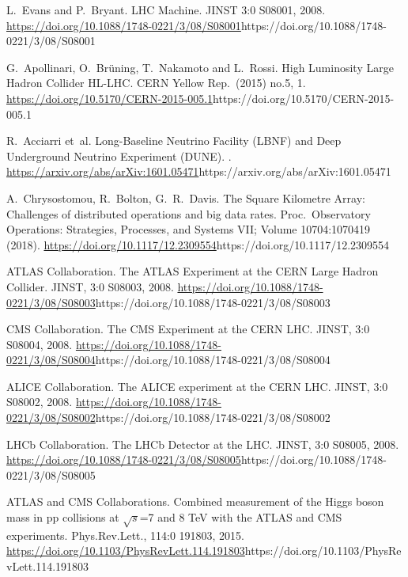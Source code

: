 \documentclass[11pt]{article}
\begin{document}
\begin{thebibliography}{99}
\itemsep=1pt
\begin{small}

L.~Evans and P.~Bryant.
\newblock LHC Machine.
\newblock JINST 3:0 S08001, 2008.
\newblock \url{https://doi.org/10.1088/1748-0221/3/08/S08001}{https://doi.org/10.1088/1748-0221/3/08/S08001}

G.~Apollinari, O.~Brüning, T.~Nakamoto and L.~Rossi.
\newblock High Luminosity Large Hadron Collider HL-LHC.
\newblock CERN Yellow Rep.\  (2015) no.5,  1.
\newblock \url{https://doi.org/10.5170/CERN-2015-005.1}{https://doi.org/10.5170/CERN-2015-005.1}

R.~Acciarri et~al.
\newblock Long-Baseline Neutrino Facility (LBNF) and Deep Underground Neutrino Experiment (DUNE).
.
\newblock \url{https://arxiv.org/abs/arXiv:1601.05471}{https://arxiv.org/abs/arXiv:1601.05471}

A.~Chrysostomou, R.~Bolton, G.~R.~Davis.
\newblock The Square Kilometre Array: Challenges of distributed operations and big data rates.
\newblock Proc.\ Observatory Operations: Strategies, Processes, and Systems VII; Volume 10704:1070419 (2018).
\newblock \url{https://doi.org/10.1117/12.2309554}{https://doi.org/10.1117/12.2309554}

ATLAS Collaboration.
\newblock The ATLAS Experiment at the CERN Large Hadron Collider.
\newblock JINST, 3:0 S08003, 2008.
\newblock \url{https://doi.org/10.1088/1748-0221/3/08/S08003}{https://doi.org/10.1088/1748-0221/3/08/S08003}

CMS Collaboration.
\newblock The CMS Experiment at the CERN LHC.
\newblock JINST, 3:0 S08004, 2008.
\newblock \url{https://doi.org/10.1088/1748-0221/3/08/S08004}{https://doi.org/10.1088/1748-0221/3/08/S08004}

ALICE Collaboration.
\newblock The ALICE experiment at the CERN LHC.
\newblock JINST, 3:0 S08002, 2008.
\newblock \url{https://doi.org/10.1088/1748-0221/3/08/S08002}{https://doi.org/10.1088/1748-0221/3/08/S08002}

LHCb Collaboration.
\newblock The LHCb Detector at the LHC.
\newblock JINST, 3:0 S08005, 2008.
\newblock \url{https://doi.org/10.1088/1748-0221/3/08/S08005}{https://doi.org/10.1088/1748-0221/3/08/S08005}

ATLAS and CMS Collaborations.
\newblock Combined measurement of the Higgs boson mass in pp collisions at $\sqrt{s}$=7 and 8 {TeV} with the ATLAS and CMS experiments.
\newblock Phys.Rev.Lett., 114:0 191803, 2015.
\newblock \url{https://doi.org/10.1103/PhysRevLett.114.191803}{https://doi.org/10.1103/PhysRevLett.114.191803}


\end{small}
\end{thebibliography}
\end{document}
